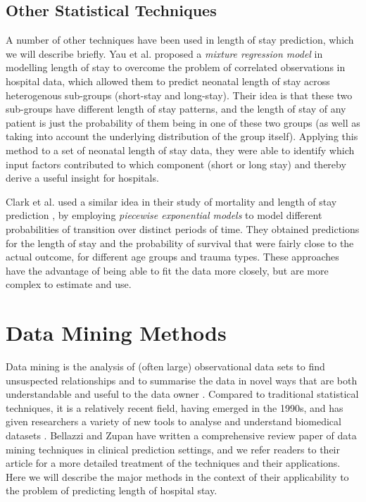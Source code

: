 \subsection{Other Statistical Techniques}
A number of other techniques have been used in length of stay prediction, which
we will describe briefly.
Yau et al. \citep{Yau2003} proposed a \textit{mixture regression model} in
modelling
length of stay to overcome the problem of correlated observations in hospital
data, which allowed them to predict neonatal length of stay across heterogenous
sub-groups (short-stay and long-stay). Their idea is that these two sub-groups
have different length of stay patterns, and the length of stay of any patient
is just the probability of them being in one of these two groups (as well as
taking into account the underlying distribution of the group itself). Applying
this method to a set of neonatal length of stay data, they were able to
identify which input factors contributed to which component (short or long
stay) and thereby derive a useful insight for hospitals.

Clark et al. used a similar idea in their study of mortality and length of stay
prediction \citep{Clark2002}, by employing \textit{piecewise exponential models}
to model different probabilities of transition over distinct periods of time.
They obtained predictions for the length of stay and the probability of
survival that were fairly close to the actual outcome, for different age groups
and trauma types. These approaches have the advantage of being able to fit the
data more closely, but are more complex to estimate and use.

\section{Data Mining Methods}
Data mining is the analysis of (often large) observational data sets to find
unsuspected relationships and to summarise the data in novel ways that are both
understandable and useful to the data owner \citep{Hand2001}. Compared to
traditional statistical techniques, it is a relatively recent field, having
emerged in the 1990s, and has
given researchers a variety of new tools to analyse and understand biomedical
datasets \citep{Bellazzi2008,Yoo2012}. Bellazzi and Zupan \citep{Bellazzi2008}
have written a
comprehensive review paper of data mining techniques in clinical prediction
settings, and we refer readers to their article for a more detailed
treatment of the techniques and their applications. Here we will describe the
major methods in the context of their applicability to the problem of
predicting length of hospital stay.

